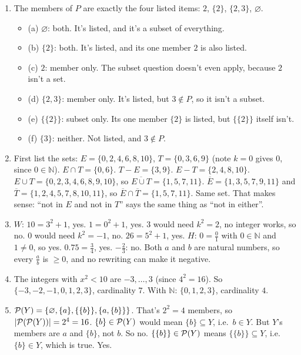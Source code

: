 \begin{enumerate}[label=\textbf{\arabic*.},leftmargin=1.8em,itemsep=0.45em]
  \item The members of $P$ are exactly the four listed items: $2$, $\{2\}$, $\{2,3\}$, $\varnothing$.
  \begin{itemize}
    \item (a) $\varnothing$: both. It's listed, and it's a subset of everything.
    \item (b) $\{2\}$: both. It's listed, and its one member $2$ is also listed.
    \item (c) $2$: member only. The subset question doesn't even apply, because $2$ isn't a set.
    \item (d) $\{2,3\}$: member only. It's listed, but $3\notin P$, so it isn't a subset.
    \item (e) $\{\{2\}\}$: subset only. Its one member $\{2\}$ is listed, but $\{\{2\}\}$ itself isn't.
    \item (f) $\{3\}$: neither. Not listed, and $3\notin P$.
  \end{itemize}
  \item First list the sets: $E=\{0,2,4,6,8,10\}$, $T=\{0,3,6,9\}$ (note $k=0$ gives $0$, since $0\in\mathbb{N}$).
  $E\cap T=\{0,6\}$. $T-E=\{3,9\}$. $E-T=\{2,4,8,10\}$. $E\cup T=\{0,2,3,4,6,8,9,10\}$, so $\overline{E\cup T}=\{1,5,7,11\}$.
  $\overline{E}=\{1,3,5,7,9,11\}$ and $\overline{T}=\{1,2,4,5,7,8,10,11\}$, so $\overline{E}\cap\overline{T}=\{1,5,7,11\}$. Same set. That makes sense: ``not in $E$ and not in $T$'' says the same thing as ``not in either''.
  \item $W$: $10=3^2+1$, yes. $1=0^2+1$, yes. $3$ would need $k^2=2$, no integer works, so no. $0$ would need $k^2=-1$, no. $26=5^2+1$, yes.
  $H$: $0=\frac01$ with $0\in\mathbb{N}$ and $1\neq0$, so yes. $0.75=\frac34$, yes. $-\frac23$: no. Both $a$ and $b$ are natural numbers, so every $\frac ab$ is $\geq0$, and no rewriting can make it negative.
  \item The integers with $x^2<10$ are $-3,\dots,3$ (since $4^2=16$). So $\{-3,-2,-1,0,1,2,3\}$, cardinality $7$. With $\mathbb{N}$: $\{0,1,2,3\}$, cardinality $4$.
  \item $\mathcal{P}(Y)=\{\varnothing,\{a\},\{\{b\}\},\{a,\{b\}\}\}$. That's $2^2=4$ members, so $|\mathcal{P}(\mathcal{P}(Y))|=2^4=16$.
  $\{b\}\in\mathcal{P}(Y)$ would mean $\{b\}\subseteq Y$, i.e.\ $b\in Y$. But $Y$'s members are $a$ and $\{b\}$, not $b$. So no.
  $\{\{b\}\}\in\mathcal{P}(Y)$ means $\{\{b\}\}\subseteq Y$, i.e.\ $\{b\}\in Y$, which is true. Yes.

\end{enumerate}
